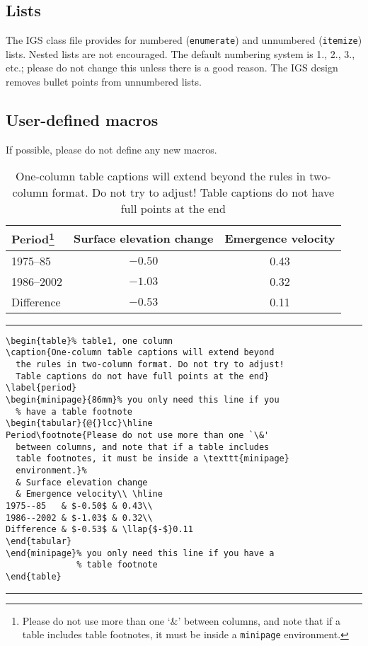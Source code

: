 \documentclass[review,oneside]{igs}
\begin{document}
\subsection{Lists}
The IGS class file provides for numbered (\verb"enumerate") and unnumbered (\verb"itemize") lists. Nested lists are not encouraged. The default numbering system is 1., 2., 3., etc.; please do not change this unless there is a good reason. The IGS design removes bullet points from unnumbered lists.

\subsection{User-defined macros}
If possible, please do not define any new macros.

\begin{table}%
\caption{One-column table captions will extend beyond
  the rules in two-column format. Do not try to adjust!
  Table captions do not have full points at the end}
\label{period}
\begin{minipage}{86mm}%
\begin{tabular}{@{}lcc}\hline
Period\footnote{Please do not use more than one `\&' 
  between columns, and note that if a table includes 
  table footnotes, it must be inside a \texttt{minipage} 
  environment.}%
  & Surface elevation change
  & Emergence velocity\\ \hline
1975--85   & $-0.50$ & 0.43\\
1986--2002 & $-1.03$ & 0.32\\
Difference & $-0.53$ & \llap{$-$}0.11
\end{tabular}
\end{minipage}%
\vspace\baselineskip\hrule %
\vspace\baselineskip
\begin{verbatim}
\begin{table}% table1, one column
\caption{One-column table captions will extend beyond
  the rules in two-column format. Do not try to adjust!
  Table captions do not have full points at the end}
\label{period}
\begin{minipage}{86mm}% you only need this line if you
  % have a table footnote
\begin{tabular}{@{}lcc}\hline
Period\footnote{Please do not use more than one `\&' 
  between columns, and note that if a table includes 
  table footnotes, it must be inside a \texttt{minipage} 
  environment.}%
  & Surface elevation change
  & Emergence velocity\\ \hline
1975--85   & $-0.50$ & 0.43\\
1986--2002 & $-1.03$ & 0.32\\
Difference & $-0.53$ & \llap{$-$}0.11
\end{tabular}
\end{minipage}% you only need this line if you have a
              % table footnote
\end{table}
\end{verbatim}
\vspace\baselineskip\hrule %
\end{table}
\end{document}
